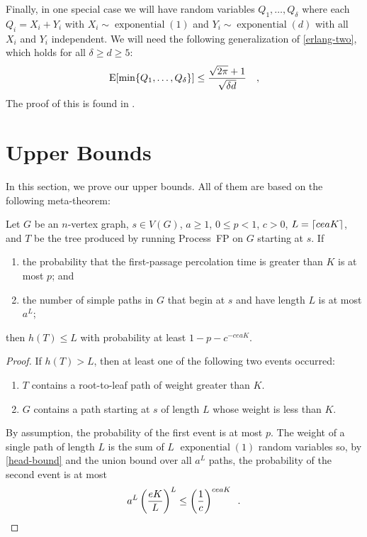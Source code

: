 \documentclass{patmorin}
\DeclareMathOperator{\exponential}{exponential}
\begin{document}
Finally, in one special case we will have random variables
$Q_1,\ldots,Q_\delta$ where each $Q_i=X_i+Y_i$ with $X_i\sim\exponential(1)$
and $Y_i\sim\exponential(d)$ with all $X_i$ and $Y_i$ independent.  We will need the following generalization of
\eqref{erlang-two}, which holds for all $\delta \ge d \ge 5$:
\begin{equation}
   \E[\min\{Q_1,\ldots,Q_\delta\}] \le \frac{\sqrt{2\pi}+1}{\sqrt{\delta d}}
     \enspace \enspace ,
     \eqlabel{non-uniform-erlang}
\end{equation}
The proof of this is found in .



\section{Upper Bounds}

In this section, we prove our upper bounds. All of them are based on
the following meta-theorem:

\begin{lem}
   Let $G$ be an $n$-vertex graph, $s\in V(G)$, $a\ge 1$, $0\le p<1$, $c>0$, 
   $L={\lceil ceaK \rceil}$, and $T$ be the tree produced by running Process~FP
   on $G$ starting at $s$.  If 
   \begin{enumerate}
      \item the probability that the first-passage percolation time is greater than $K$ is at most $p$; and

      \item the number of simple paths in $G$ that begin at $s$ and have
        length $L$ is at most $a^L$;
   \end{enumerate}
   then $h(T) \le L$ with probability at least $1-p-c^{-ceaK}$.
\end{lem}

\begin{proof}
   If $h(T)> L$, then at least one of the following two events occurred:
   \begin{enumerate}
     \item $T$ contains a root-to-leaf path of weight greater than $K$.
     \item $G$ contains a path starting at $s$ of length $L$ whose weight 
        is less than $K$.
   \end{enumerate}
   By assumption, the probability of the first event is at most $p$.  
   The weight of a single path of length $L$ is the sum of $L$ $\exponential(1)$
   random variables so, by \eqref{head-bound} and the union bound over
   all $a^L$ paths, the probability of the second event is at most
   \[
       a^L \left(\frac{eK}{L} \right)^L \le \left(\frac{1}{c}\right)^{ceaK}
       \enspace . \qedhere
   \]
\end{proof}
\end{document}
